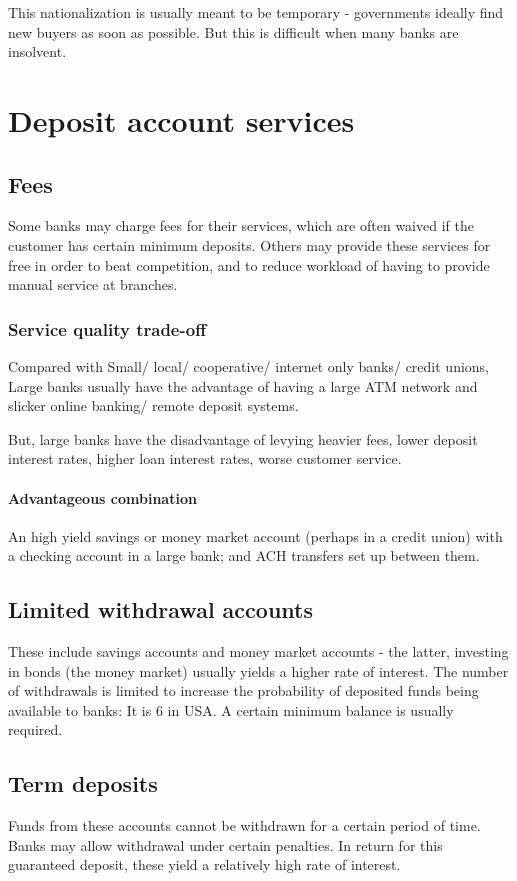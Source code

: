 \documentclass[oneside, article]{memoir}
\begin{document}
This nationalization is usually meant to be temporary - governments ideally find new buyers as soon as possible. But this is difficult when many banks are insolvent.

\section{Deposit account services}
\subsection{Fees}
Some banks may charge fees for their services, which are often waived if the customer has certain minimum deposits. Others may provide these services for free in order to beat competition, and to reduce workload of having to provide manual service at branches.

\subsubsection{Service quality trade-off}
Compared with Small/ local/ cooperative/ internet only banks/ credit unions, Large banks usually have the advantage of having a large ATM network and slicker online banking/ remote deposit systems.

But, large banks have the disadvantage of levying heavier fees, lower deposit interest rates, higher loan interest rates, worse customer service.

\paragraph{Advantageous combination}
An high yield savings or money market account (perhaps in a credit union) with a checking account in a large bank; and ACH transfers set up between them.

\subsection{Limited withdrawal accounts}
These include savings accounts and money market accounts - the latter, investing in bonds (the money market) usually yields a higher rate of interest. The number of withdrawals is limited to increase the probability of deposited funds being available to banks: It is 6 in USA. A certain minimum balance is usually required.

\subsection{Term deposits}
Funds from these accounts cannot be withdrawn for a certain period of time. Banks may allow withdrawal under certain penalties. In return for this guaranteed  deposit, these yield a relatively high rate of interest.
\end{document}
